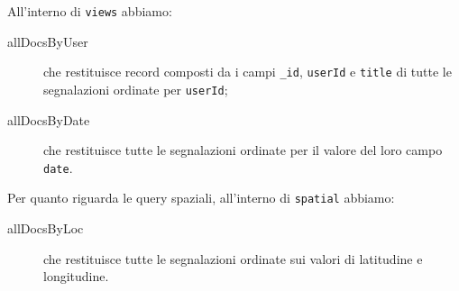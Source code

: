                 All'interno di \texttt{views} abbiamo:
                \begin{description}
                    \item[allDocsByUser] che restituisce record composti da i 
                    campi \texttt{\_id}, \texttt{userId} e \texttt{title} di 
                    tutte le segnalazioni ordinate per \texttt{userId};
                    \item[allDocsByDate] che restituisce tutte le segnalazioni 
                    ordinate per il valore del loro campo \texttt{date}.
                \end{description}
                
                Per quanto riguarda le query spaziali, all'interno di 
                \texttt{spatial} abbiamo:
                \begin{description}
                    \item[allDocsByLoc] che restituisce tutte le segnalazioni 
                    ordinate sui valori di latitudine e longitudine.
                \end{description}
                
